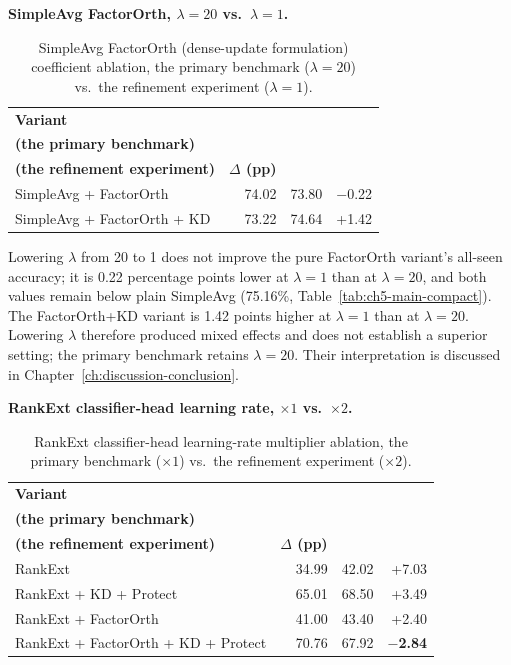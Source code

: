 \textbf{SimpleAvg FactorOrth, $\lambda=20$ vs.\ $\lambda=1$.}

\begin{table}[htbp]
\centering
\begin{tabularx}{\textwidth}{@{}>{\raggedright\arraybackslash}X r r r@{}}
\toprule
\textbf{Variant} & \shortstack[r]{\textbf{$\lambda=20$}\\\textbf{(the primary benchmark)}} & \shortstack[r]{\textbf{$\lambda=1$}\\\textbf{(the refinement experiment)}} & \textbf{$\Delta$ (pp)} \\
\midrule
SimpleAvg + FactorOrth & 74.02 & 73.80 & $-$0.22 \\
SimpleAvg + FactorOrth + KD & 73.22 & 74.64 & +1.42 \\
\bottomrule
\end{tabularx}
\caption[SimpleAvg FactorOrth $\lambda$ ablation]{SimpleAvg FactorOrth
(dense-update formulation) coefficient ablation, the primary benchmark ($\lambda=20$) vs.\ the refinement experiment
($\lambda=1$).}
\label{tab:ch5-sa-factororth-ablation}
\end{table}

Lowering $\lambda$ from 20 to 1 does not improve the pure FactorOrth
variant's all-seen accuracy; it is 0.22 percentage points lower at
$\lambda=1$ than at $\lambda=20$, and both values remain below plain
SimpleAvg (75.16\%, Table~\ref{tab:ch5-main-compact}). The FactorOrth+KD
variant is 1.42 points higher at $\lambda=1$ than at $\lambda=20$. Lowering
$\lambda$ therefore produced mixed effects and does not establish a superior
setting; the primary benchmark retains $\lambda=20$. Their interpretation is
discussed in Chapter~\ref{ch:discussion-conclusion}.

\textbf{RankExt classifier-head learning rate, $\times1$ vs.\ $\times2$.}

\begin{table}[htbp]
\centering
\begin{tabularx}{\textwidth}{@{}>{\raggedright\arraybackslash}X r r r@{}}
\toprule
\textbf{Variant} & \shortstack[r]{\textbf{$\times1$}\\\textbf{(the primary benchmark)}} & \shortstack[r]{\textbf{$\times2$}\\\textbf{(the refinement experiment)}} & \textbf{$\Delta$ (pp)} \\
\midrule
RankExt & 34.99 & 42.02 & +7.03 \\
RankExt + KD + Protect & 65.01 & 68.50 & +3.49 \\
RankExt + FactorOrth & 41.00 & 43.40 & +2.40 \\
RankExt + FactorOrth + KD + Protect & 70.76 & 67.92 & \textbf{$-$2.84} \\
\bottomrule
\end{tabularx}
\caption[RankExt head-LR ablation]{RankExt classifier-head learning-rate
multiplier ablation, the primary benchmark ($\times1$) vs.\ the refinement experiment ($\times2$).}
\label{tab:ch5-rankext-headlr-ablation}
\end{table}

